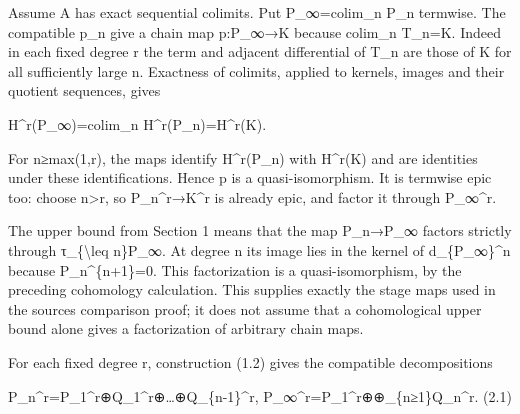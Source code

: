 Assume A has exact sequential colimits. Put P\_\allowbreak{}∞\allowbreak{}=colim\_\allowbreak{}n P\_\allowbreak{}n termwise. The compatible p\_\allowbreak{}n give a chain map p:\allowbreak{}P\_\allowbreak{}∞\allowbreak{}→K because colim\_\allowbreak{}n T\_\allowbreak{}n\allowbreak{}=K. Indeed in each fixed degree r the term and adjacent differential of T\_\allowbreak{}n are those of K for all sufficiently large n. Exactness of colimits,\allowbreak{} applied to kernels,\allowbreak{} images and their quotient sequences,\allowbreak{} gives

H\textasciicircum{}r(P\_\allowbreak{}∞)\allowbreak{}\allowbreak{}=colim\_\allowbreak{}n H\textasciicircum{}r(P\_\allowbreak{}n)\allowbreak{}\allowbreak{}=H\textasciicircum{}r(K)\allowbreak{}.

For n≥max(1,\allowbreak{}r)\allowbreak{},\allowbreak{} the maps identify H\textasciicircum{}r(P\_\allowbreak{}n)\allowbreak{} with H\textasciicircum{}r(K)\allowbreak{} and are identities under these identifications. Hence p is a quasi-isomorphism. It is termwise epic too:\allowbreak{} choose n>r,\allowbreak{} so P\_\allowbreak{}n\textasciicircum{}r\allowbreak{}→K\textasciicircum{}r is already epic,\allowbreak{} and factor it through P\_\allowbreak{}∞\textasciicircum{}r.

The upper bound from Section 1 means that the map P\_\allowbreak{}n\allowbreak{}→P\_\allowbreak{}∞ factors strictly through τ\_\allowbreak{}\{\textbackslash{}leq n\}P\_\allowbreak{}∞. At degree n its image lies in the kernel of d\_\allowbreak{}\{P\_\allowbreak{}∞\}\textasciicircum{}n because P\_\allowbreak{}n\textasciicircum{}\{n\allowbreak{}+1\}\allowbreak{}=0. This factorization is a quasi-isomorphism,\allowbreak{} by the preceding cohomology calculation. This supplies exactly the stage maps used in the source\textquotesingle s comparison proof; it does not assume that a cohomological upper bound alone gives a factorization of arbitrary chain maps.

For each fixed degree r,\allowbreak{} construction (1.2)\allowbreak{} gives the compatible decompositions

P\_\allowbreak{}n\textasciicircum{}r\allowbreak{}=P\_\allowbreak{}1\textasciicircum{}r\allowbreak{}⊕Q\_\allowbreak{}1\textasciicircum{}r\allowbreak{}⊕…\allowbreak{}⊕Q\_\allowbreak{}\{n-1\}\textasciicircum{}r,\allowbreak{} P\_\allowbreak{}∞\textasciicircum{}r\allowbreak{}=P\_\allowbreak{}1\textasciicircum{}r\allowbreak{}⊕\allowbreak{}⊕\_\allowbreak{}\{n≥1\}Q\_\allowbreak{}n\textasciicircum{}r. (2.1)\allowbreak{}

